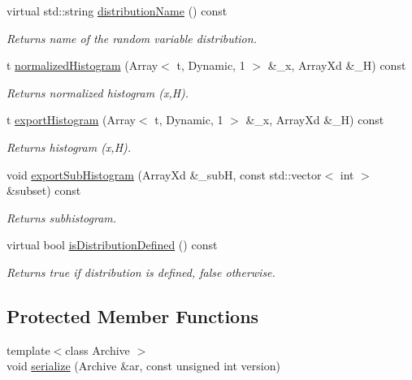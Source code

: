 \begin{DoxyCompactItemize}
virtual std\-::string \hyperlink{class_go_s_u_m_1_1_t_model_variable_aa41c0ebb9c0e5dfbb98c2ea66a77890d}{distribution\-Name} () const 
\begin{DoxyCompactList}\small\item\em Returns name of the random variable distribution. \end{DoxyCompactList}\item 
t \hyperlink{class_go_s_u_m_1_1_t_model_variable_a25c6c52d753c9273ee1d0a9d1b845b3d}{normalized\-Histogram} (Array$<$ t, Dynamic, 1 $>$ \&\-\_\-x, Array\-Xd \&\-\_\-\-H) const 
\begin{DoxyCompactList}\small\item\em Returns normalized histogram (x,H). \end{DoxyCompactList}\item 
t \hyperlink{class_go_s_u_m_1_1_t_model_variable_a9a436fbe029936882a0cbf2d6ada20ed}{export\-Histogram} (Array$<$ t, Dynamic, 1 $>$ \&\-\_\-x, Array\-Xd \&\-\_\-\-H) const 
\begin{DoxyCompactList}\small\item\em Returns histogram (x,H). \end{DoxyCompactList}\item 
void \hyperlink{class_go_s_u_m_1_1_t_model_variable_a05956fc110017f6a9e856901d1072a31}{export\-Sub\-Histogram} (Array\-Xd \&\-\_\-sub\-H, const std\-::vector$<$ int $>$ \&subset) const 
\begin{DoxyCompactList}\small\item\em Returns subhistogram. \end{DoxyCompactList}\item 
virtual bool \hyperlink{class_go_s_u_m_1_1_t_model_variable_a49e8bb3711a10e298e90cb6a8d12661a}{is\-Distribution\-Defined} () const 
\begin{DoxyCompactList}\small\item\em Returns true if distribution is defined, false otherwise. \end{DoxyCompactList}\end{DoxyCompactItemize}
\subsection*{Protected Member Functions}
\begin{DoxyCompactItemize}
\item 
{\footnotesize template$<$class Archive $>$ }\\void \hyperlink{class_go_s_u_m_1_1_t_model_variable_a0a5c395a4ff28acc07f8e5670ff9d289}{serialize} (Archive \&ar, const unsigned int version)
\end{DoxyCompactItemize}
